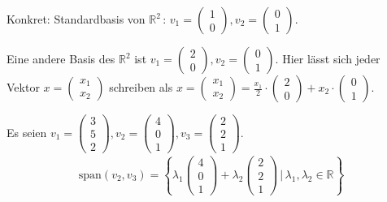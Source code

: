 Konkret: Standardbasis von $\mathbb{R}^2\,:\,v_1=\begin{pmatrix}1\\0\end{pmatrix},v_2=\begin{pmatrix}0\\1\end{pmatrix}$.

Eine andere Basis des $\mathbb{R}^2$ ist $v_1=\begin{pmatrix}2\\0\end{pmatrix},v_2=\begin{pmatrix}0\\1\end{pmatrix}$. Hier lässt sich jeder Vektor $x = \begin{pmatrix}x_1\\x_2\end{pmatrix}$ schreiben als $x = \begin{pmatrix}x_1\\x_2\end{pmatrix} = \frac{x_1}{2}\cdot\begin{pmatrix}2\\0\end{pmatrix} + x_2 \cdot\begin{pmatrix}0\\1\end{pmatrix}$.

Es seien $v_1 = \begin{pmatrix}3\\5\\2\end{pmatrix}, v_2 = \begin{pmatrix}4\\0\\1\end{pmatrix}, v_3 = \begin{pmatrix}2\\2\\1\end{pmatrix}$.
\begin{align*}
	\text{span}(v_2, v_3) = \left\{\lambda _1 \begin{pmatrix}4\\0\\1\end{pmatrix} + \lambda _2 \begin{pmatrix}2\\2\\1\end{pmatrix} \,\Bigg|\, \lambda _1, \lambda _2 \in \mathbb{R} \right\}
\end{align*}

